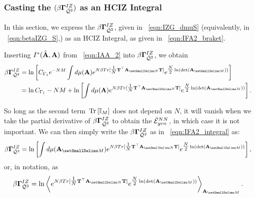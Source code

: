 \subsubsection{Casting the \GeneratingFunction $(\beta\mathbf{\Gamma}^{IZ}_{\bar{\mathcal{Q}}^{2}})$ as an HCIZ Integral}
\label{sxn:TraceLogDerivation_B}

In this section, we express the \GeneratingFunction $\beta\mathbf{\Gamma}^{IZ}_{\bar{\mathcal{Q}}^{2}}$, 
given in \EQN~\ref{eqn:IZG_dmuS} (equivalently, in \EQN~\ref{eqn:betaIZG_S},) 
as an HCIZ Integral, 
as given in \EQN~\ref{eqn:IFA2_braket}.

Inserting $I^{*}(\hat{\mathbf{A}},\mathbf{A})$ from \EQN~\ref{eqn:IAA_2} into $\beta\mathbf{\Gamma}^{IZ}_{\bar{\mathcal{Q}}^{2}}$, we obtain
\begin{align}
  \label{eqn:IZG_IAA}
  \IZG 
  & =  \ln \left[ C_{\Gamma_1} e^{-NM}\int d\mu(\AMAT)
  e^{N\beta Tr[ \tfrac{1}{N}\TMAT^{\top}\AMATN\TMAT] }
  e^{\tfrac{N}{2}\ln(\Det{\AMATM})}\right]  \\ \nonumber
  & =
    \ln  C_{\Gamma_1}
  - NM
  +  \ln \left[ \int d\mu(\AMAT)
    e^{N\beta Tr[ \tfrac{1}{N}\TMAT^{\top}\AMATN\TMAT] }
    e^{\tfrac{N}{2}\ln(\Det{\AMATM})}\right]  .
\end{align}

\noindent
So long as the second term $\mbox{}\operatorname{Tr}\left[\mathbb{I}_{M}\right]$ does not depend on $N$, 
it will vanish when we take the partial derivative of $\beta\mathbf{\Gamma}^{IZ}_{\bar{\mathcal{Q}}^{2}}$ to obtain the $\bar{\mathcal{E}}^{NN}_{gen}$, in which case it is not important.  
We can then simply write the \GeneratingFunction $\beta\mathbf{\Gamma}^{IZ}_{\bar{\mathcal{Q}}^{2}}$  as in \EQN~\ref{eqn:IFA2_integral} as:
\begin{align}
  \label{eqn:IZG_integral}
  \IZG 
   =  \ln \left[ \int d\mu(\AMATM)
    e^{N\beta Tr[ \tfrac{1}{N}\TMAT^{\top}\AMATN\TMAT] }
    e^{\tfrac{N}{2}\ln(\Det{\AMATM})}\right]  ,
\end{align}
or, in \BraKet notation, as
\begin{align}
  \label{eqn:IZG_braket}
  \IZG = 
   \ln\left\langle
  e^{N\beta Tr[ \tfrac{1}{N}\TMAT^{\top}\AMATN\TMAT] }
  e^{\tfrac{N}{2}\ln(\Det{\AMATM})}
  \right\rangle_{\AMATM}   .
\end{align}



